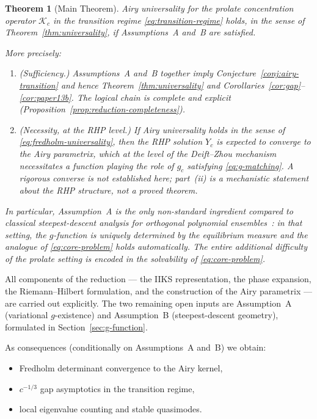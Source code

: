 \documentclass[12pt,a4paper]{amsart}
\newtheorem{theorem}{Theorem}[section]
\theoremstyle{definition}
\theoremstyle{remark}
\newcommand{\Kc}{\mathcal{K}_c}
\begin{document}
\begin{theorem}[Main Theorem]
\label{thm:main}
Airy universality for the prolate concentration operator $\Kc$
in the transition regime \eqref{eq:transition-regime} holds,
in the sense of Theorem~\ref{thm:universality}, if
Assumptions~A and~B are satisfied.

More precisely:
\begin{enumerate}[label=(\roman*)]
\item \textup{(Sufficiency.)} Assumptions~A and~B together imply
  Conjecture~\ref{conj:airy-transition} and hence
  Theorem~\ref{thm:universality} and
  Corollaries~\ref{cor:gap}--\ref{cor:paper13b}.
  The logical chain is complete and explicit
  (Proposition~\ref{prop:reduction-completeness}).
\item \textup{(Necessity, at the RHP level.)} If Airy universality
  holds in the sense of \eqref{eq:fredholm-universality}, then the
  RHP solution $Y_c$ is expected to converge to the Airy parametrix,
  which at the level of the Deift--Zhou mechanism necessitates a
  function playing the role of $g_c$ satisfying \eqref{eq:g-matching}.
  A rigorous converse is not established here; part~(ii) is a
  mechanistic statement about the RHP structure, not a proved theorem.
\end{enumerate}
In particular, Assumption~A is the only non-standard ingredient
compared to classical steepest-descent analysis for orthogonal
polynomial ensembles~\cite{Deift1999}: in that setting, the
$g$-function is uniquely determined by the equilibrium measure
and the analogue of \eqref{eq:core-problem} holds automatically.
The entire additional difficulty of the prolate setting is encoded
in the solvability of \eqref{eq:core-problem}.
\end{theorem}

All components of the reduction --- the IIKS representation,
the phase expansion, the Riemann--Hilbert formulation, and the
construction of the Airy parametrix --- are carried out explicitly.
The two remaining open inputs are Assumption~A
(variational $g$-existence) and Assumption~B
(steepest-descent geometry), formulated in
Section~\ref{sec:g-function}.

As consequences (conditionally on Assumptions~A and~B) we obtain:
\begin{itemize}
\item Fredholm determinant convergence to the Airy kernel,
\item $c^{-1/3}$ gap asymptotics in the transition regime,
\item local eigenvalue counting and stable quasimodes.
\end{itemize}
\end{document}
